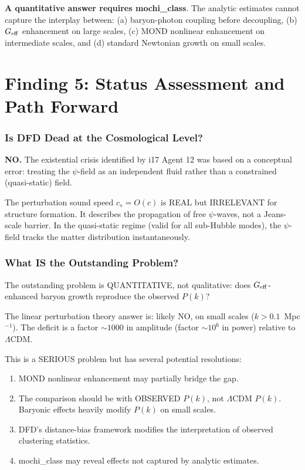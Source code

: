 \documentclass[11pt]{article}
\begin{document}
\textbf{A quantitative answer requires mochi\_class}. The analytic
estimates cannot capture the interplay between: (a) baryon-photon
coupling before decoupling, (b) $G_{\rm eff}$ enhancement on large
scales, (c) MOND nonlinear enhancement on intermediate scales, and
(d) standard Newtonian growth on small scales.


\part{Finding 5: Status Assessment and Path Forward}
\label{part:status}

\section{Is DFD Dead at the Cosmological Level?}

\textbf{NO.} The existential crisis identified by i17 Agent 12 was based
on a conceptual error: treating the $\psi$-field as an independent fluid
rather than a constrained (quasi-static) field.

The perturbation sound speed $c_s = O(c)$ is REAL but IRRELEVANT for
structure formation. It describes the propagation of free $\psi$-waves,
not a Jeans-scale barrier. In the quasi-static regime (valid for all
sub-Hubble modes), the $\psi$-field tracks the matter distribution
instantaneously.

\section{What IS the Outstanding Problem?}

The outstanding problem is QUANTITATIVE, not qualitative: does
$G_{\rm eff}$-enhanced baryon growth reproduce the observed $P(k)$?

The linear perturbation theory answer is: likely NO, on small scales
($k > 0.1$~Mpc$^{-1}$). The deficit is a factor $\sim 1000$ in
amplitude (factor $\sim 10^6$ in power) relative to $\Lambda$CDM.

This is a SERIOUS problem but has several potential resolutions:
\begin{enumerate}[nosep]
\item MOND nonlinear enhancement may partially bridge the gap.
\item The comparison should be with OBSERVED $P(k)$, not $\Lambda$CDM
  $P(k)$. Baryonic effects heavily modify $P(k)$ on small scales.
\item DFD's distance-bias framework modifies the interpretation of
  observed clustering statistics.
\item mochi\_class may reveal effects not captured by analytic estimates.
\end{enumerate}
\end{document}
